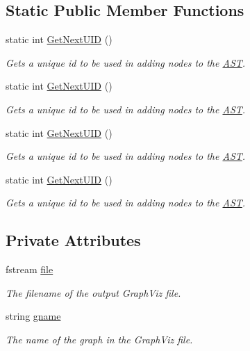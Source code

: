 \subsection*{Static Public Member Functions}
\begin{DoxyCompactItemize}
\item 
static int \hyperlink{classVisualizer_a300cf71187da1d6d3feab998fb805991}{Get\-Next\-U\-I\-D} ()
\begin{DoxyCompactList}\small\item\em Gets a unique id to be used in adding nodes to the \hyperlink{classAST}{A\-S\-T}. \end{DoxyCompactList}\item 
static int \hyperlink{classVisualizer_a300cf71187da1d6d3feab998fb805991}{Get\-Next\-U\-I\-D} ()
\begin{DoxyCompactList}\small\item\em Gets a unique id to be used in adding nodes to the \hyperlink{classAST}{A\-S\-T}. \end{DoxyCompactList}\item 
static int \hyperlink{classVisualizer_a300cf71187da1d6d3feab998fb805991}{Get\-Next\-U\-I\-D} ()
\begin{DoxyCompactList}\small\item\em Gets a unique id to be used in adding nodes to the \hyperlink{classAST}{A\-S\-T}. \end{DoxyCompactList}\item 
static int \hyperlink{classVisualizer_a300cf71187da1d6d3feab998fb805991}{Get\-Next\-U\-I\-D} ()
\begin{DoxyCompactList}\small\item\em Gets a unique id to be used in adding nodes to the \hyperlink{classAST}{A\-S\-T}. \end{DoxyCompactList}\end{DoxyCompactItemize}
\subsection*{Private Attributes}
\begin{DoxyCompactItemize}
\item 
\hypertarget{classVisualizer_a19e773638cb9f4665a9bdb44348f584c}{fstream \hyperlink{classVisualizer_a19e773638cb9f4665a9bdb44348f584c}{file}}\label{classVisualizer_a19e773638cb9f4665a9bdb44348f584c}

\begin{DoxyCompactList}\small\item\em The filename of the output Graph\-Viz file. \end{DoxyCompactList}\item 
\hypertarget{classVisualizer_a931ff38910382c55271e07617aac0422}{string \hyperlink{classVisualizer_a931ff38910382c55271e07617aac0422}{gname}}\label{classVisualizer_a931ff38910382c55271e07617aac0422}

\begin{DoxyCompactList}\small\item\em The name of the graph in the Graph\-Viz file. \end{DoxyCompactList}\end{DoxyCompactItemize}
